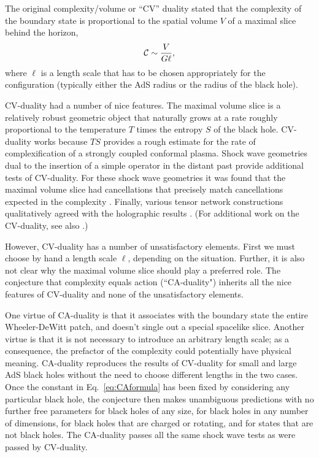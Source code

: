 \documentclass[12pt]{article}
\numberwithin{equation}{section}
\newcommand{\beq}{\begin{equation}}
\newcommand{\eeq}{\end{equation}}
\def\CC{{\cal C}}
\begin{document}
The original complexity/volume  or ``CV'' duality \cite{complexityshocks} stated that the complexity of the boundary state is proportional to  the spatial volume $V$ of a maximal slice behind the horizon,
\beq
\CC \sim \frac{V}{G \ell},
\label{CV--duality}
\eeq
where  $\ell$ is a length scale that has to be chosen appropriately for the configuration (typically either the AdS radius or the radius of the black hole).

 CV-duality had a number of nice features. The maximal volume slice is a relatively robust geometric object that naturally grows at a rate roughly proportional to the temperature $T$ times the entropy $S$ of the black hole. CV-duality works because $TS$ provides a rough estimate for the rate of complexification of a strongly coupled conformal plasma. Shock wave geometries dual to the insertion of a simple operator in the distant past  provide additional tests of CV-duality. For these shock wave geometries it was found that the maximal volume slice had cancellations that precisely match cancellations expected in the complexity \cite{complexityshocks,localshocks, Susskind:2014jwa}. Finally, various tensor network constructions qualitatively agreed with the holographic results \cite{complexityshocks,localshocks}. (For additional work on the CV-duality, see also \cite{Alishahiha:2015rta,Barbon:2015ria,Barbon:2015soa}.)

However,  CV-duality has a number of unsatisfactory elements. First we must choose by hand a length scale $\ell$, depending on the situation. Further, it is also not clear why the maximal volume slice should play a preferred role. The conjecture that complexity equals action  (``CA-duality") inherits all the nice features of CV-duality and none of the unsatisfactory elements.

One virtue of CA-duality is that it associates with the boundary state the entire Wheeler-DeWitt patch, and doesn't single out a special spacelike slice. Another virtue is that it is not necessary to introduce an arbitrary length scale; as a consequence, the prefactor of the complexity could  potentially have physical meaning. CA-duality reproduces the results of CV-duality for small and large AdS black holes without the need to choose different lengths in the two cases. Once the constant in Eq.~\ref{eq:CAformula} has been fixed by considering any particular black hole, the conjecture then makes unambiguous predictions with no further free parameters for black holes of any size, for black holes in any number of dimensions,  for black holes that are charged or rotating, and for states that are not black holes. The CA-duality passes all the same shock wave tests as were passed by CV-duality.
\end{document}

